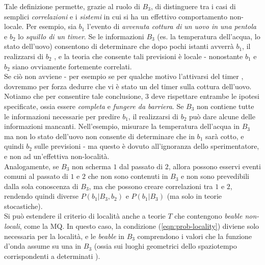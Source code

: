 \documentclass[../../InformazioneQuantistica.tex]{subfiles}
\begin{document}
\begin{expl}
Tale definizione permette, grazie al ruolo di $B_3$, di distinguere tra i casi di semplici \textit{correlazioni} e i \textit{sistemi} in cui si ha un effettivo comportamento non-locale.
Per esempio, sia $b_1$ l'evento di \textit{avvenuta cottura di un uovo in una pentola} e $b_2$ lo \textit{squillo di un timer}. Se le informazioni $B_3$ (es. la temperatura dell'acqua, lo stato dell'uovo) consentono di determinare che dopo pochi istanti avverrà $b_1$, il realizzarsi di $b_2$ , e la teoria che consente tali previsioni è locale - nonostante $b_1$ e $b_2$ siano ovviamente fortemente correlati. \\
Se ciò non avviene - per esempio se per qualche motivo l'attivarsi del timer , dovremmo per forza dedurre che vi è stato un  del timer sulla cottura dell'uovo. Notiamo che per consentire tale conclusione, $3$ deve rispettare entrambe le ipotesi specificate, ossia essere \textit{completa} e \textit{fungere da barriera}. Se $B_3$ non contiene tutte le informazioni necessarie per predire $b_1$, il realizzarsi di $b_2$ può dare alcune delle informazioni mancanti. Nell'esempio, misurare la temperatura dell'acqua in $B_3$ ma non lo stato dell'uovo non consente di determinare che in $b_1$ sarà cotto, e quindi $b_2$  sulle previsioni - ma questo è dovuto all'ignoranza dello sperimentatore, e non ad un'effettiva non-località.\\
Analogamente, se $B_3$ non scherma $1$ dal passato di $2$, allora possono esservi eventi comuni al passato di $1$ e $2$ che non sono contenuti in $B_3$ e non sono prevedibili dalla sola conoscenza di $B_3$, ma che possono creare correlazioni tra $1$ e $2$, rendendo quindi diverse $P(b_1|B_3,b_2)$ e $P(b_1|B_3)$ (ma solo in teorie stocastiche).\\

Si può estendere il criterio di località anche a teorie $T$ che contengono \textit{beable non-locali}, come la MQ. In questo caso, la condizione (\ref{eqn:prob-locality}) diviene solo necessaria per la località, e le \textit{beable} in $B_3$ comprendono i valori che la funzione d'onda assume su una  in $B_3$ (ossia sui luoghi geometrici dello spaziotempo corrispondenti a determinati ).
\end{expl}
\end{document}

